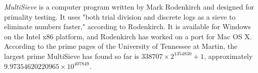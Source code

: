 \documentclass[12pt]{article}
\begin{document}
\emph{MultiSieve} is a computer program written by Mark Rodenkirch and  designed for primality testing. It uses "both trial division and discrete logs as a sieve to eliminate numbers faster," according to Rodenkirch. It is available for Windows on the Intel x86 platform, and Rodenkirch has worked on a port for Mac OS X. According to the prime pages of the University of Tennessee at Martin, the largest prime MultiSieve has found so far is $338707 \times 2^{1354830} + 1$, approximately $9.97354620220965 \times 10^{407849}$.
\end{document}
